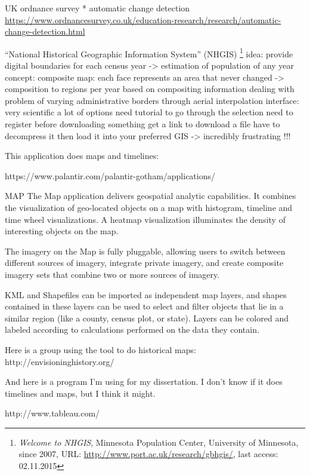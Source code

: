     UK ordnance survey
      * automatic change detection
      \url{https://www.ordnancesurvey.co.uk/education-research/research/automatic-change-detection.html}

  ``National Historical Geographic Information System'' (NHGIS)
    \footnote{
      \textit{Welcome to NHGIS},
      Minnesota Population Center, University of Minnesota,
      since 2007,
      URL: \url{http://www.port.ac.uk/research/gbhgis/},
      last access: 02.11.2015
    }
    idea:
      provide digital boundaries for each census year
      -> estimation of population of any year
    concept:
      composite map: each face represents an area that never changed
      -> composition to regions per year based on compositing information
      dealing with problem of varying administrative borders through aerial interpolation
    interface:
      very scientific a lot of options
      need tutorial to go through the selection
      need to register before downloading something
      get a link to download a file
      have to decompress it
      then load it into your preferred GIS
      -> incredibly frustrating !!!


This application does maps and timelines:

https://www.palantir.com/palantir-gotham/applications/

MAP
The Map application delivers geospatial analytic capabilities. It combines the visualization of geo-located objects on a map with histogram, timeline and time wheel visualizations. A heatmap visualization illuminates the density of interesting objects on the map.

The imagery on the Map is fully pluggable, allowing users to switch between different sources of imagery, integrate private imagery, and create composite imagery sets that combine two or more sources of imagery.

KML and Shapefiles can be imported as independent map layers, and shapes contained in these layers can be used to select and filter objects that lie in a similar region (like a county, census plot, or state). Layers can be colored and labeled according to calculations performed on the data they contain.


Here is a group using the tool to do historical maps: http://envisioninghistory.org/


And here is a program I’m using for my dissertation. I don’t know if it does timelines and maps, but I think it might.

http://www.tableau.com/

